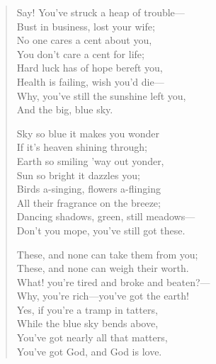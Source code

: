

\begin{verse}
Say! You've struck a heap of trouble—\\
\hspace*{3em} Bust in business, lost your wife;\\
No one cares a cent about you,\\
\hspace*{3em}You don't care a cent for life;\\
Hard luck has of hope bereft you,\\
\hspace*{3em}Health is failing, wish you'd die—\\
Why, you've still the sunshine left you,\\
\hspace*{3em}And the big, blue sky.

\hspace*{6em}Sky so blue it makes you wonder\\
\hspace*{9em}If it's heaven shining through;\\
\hspace*{6em}Earth so smiling 'way out yonder,\\
\hspace*{9em}Sun so bright it dazzles you;\\
\hspace*{6em}Birds a-singing, flowers a-flinging\\
\hspace*{9em}All their fragrance on the breeze;\\
\hspace*{6em}Dancing shadows, green, still meadows—\\
\hspace*{9em}Don't you mope, you've still got these.

These, and none can take them from you;\\
\hspace*{3em}These, and none can weigh their worth.\\
What! you're tired and broke and beaten?—\\
\hspace*{3em}Why, you're rich—you've got the earth!\\
Yes, if you're a tramp in tatters,\\
\hspace*{3em}While the blue sky bends above,\\
You've got nearly all that matters,\\
\hspace*{3em}You've got God, and God is love.

\end{verse}
